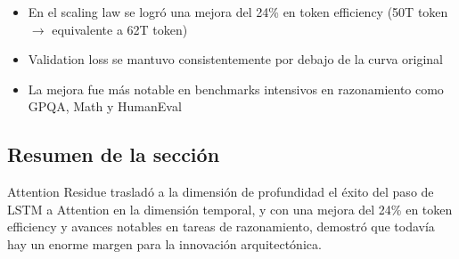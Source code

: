 \begin{itemize}
    \item En el scaling law se logró una mejora del 24\% en token efficiency (50T token $\rightarrow$ equivalente a 62T token)
    \item Validation loss se mantuvo consistentemente por debajo de la curva original
    \item La mejora fue más notable en benchmarks intensivos en razonamiento como GPQA, Math y HumanEval
\end{itemize}

\subsection{Resumen de la sección}

Attention Residue trasladó a la dimensión de profundidad el éxito del paso de LSTM a Attention en la dimensión temporal, y con una mejora del 24\% en token efficiency y avances notables en tareas de razonamiento, demostró que todavía hay un enorme margen para la innovación arquitectónica.

